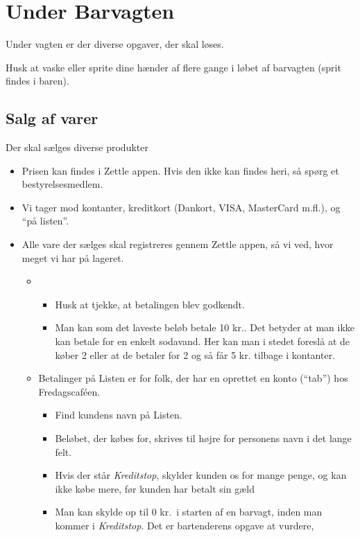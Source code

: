 \section{Under Barvagten}
\label{sec:intra-barvagten}

Under vagten er der diverse opgaver, der skal løses.

Husk at vaske eller sprite dine hænder af flere gange i løbet af barvagten (sprit findes i baren).

\subsection{Salg af varer}
\label{sec:intra:salg}

Der skal sælges diverse produkter
\begin{itemize}
\item Prisen kan findes i Zettle appen. Hvis den ikke kan findes heri, så spørg et bestyrelsesmedlem.
\item Vi tager mod kontanter, kreditkort (Dankort, VISA, MasterCard
  m.fl.), og ``på listen''.
\item Alle vare der sælges skal registreres gennem Zettle appen, så vi ved, hvor meget vi har på lageret.
  \begin{itemize}
  \item 
    \begin{itemize}
    \item Husk at tjekke, at betalingen blev godkendt.
    \item Man kan som det laveste beløb betale 10 kr.. Det betyder at man ikke kan betale for en enkelt sodavand. Her kan man i stedet foreslå at de køber 2 eller at de betaler for 2 og så får 5 kr. tilbage i kontanter.
    \end{itemize}
  \item Betalinger på Listen er for folk, der har en oprettet en konto
    (``tab'') hos Fredagscaféen.
    \begin{itemize}
    \item Find kundens navn på Listen.
    \item Beløbet, der købes for, skrives til højre for personens navn
      i det lange felt.
    \item Hvis der står \emph{Kreditstop}, skylder kunden os for mange
      penge, og kan ikke købe mere, før kunden har betalt sin gæld
    \item Man kan skylde op til 0 kr.\ i starten af en barvagt, inden
      man kommer i \emph{Kreditstop}. Det er bartenderens opgave at vurdere,

\end{itemize}
\end{itemize}
\end{itemize}
